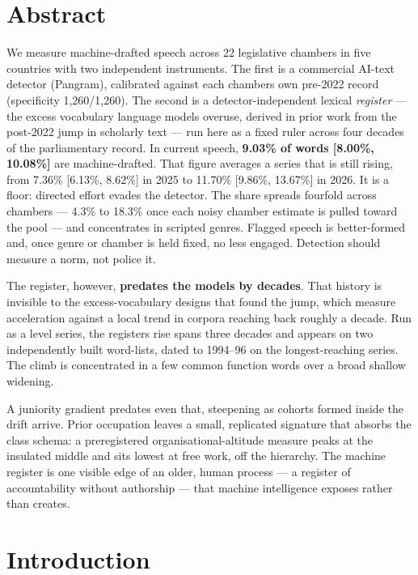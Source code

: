 \section*{Abstract}

We measure machine-drafted speech across 22 legislative chambers in five countries with two independent instruments. The first is a commercial AI-text detector (Pangram), calibrated against each chamber\textquotesingle s own pre-2022 record (specificity 1,260/1,260). The second is a detector-independent lexical \emph{register} --- the excess vocabulary language models overuse, derived in prior work from the post-2022 jump in scholarly text --- run here as a fixed ruler across four decades of the parliamentary record. In current speech, \textbf{9.03\% of words {[}8.00\%, 10.08\%{]}} are machine-drafted. That figure averages a series that is still rising, from 7.36\% {[}6.13\%, 8.62\%{]} in 2025 to 11.70\% {[}9.86\%, 13.67\%{]} in 2026. It is a floor: directed effort evades the detector. The share spreads fourfold across chambers --- 4.3\% to 18.3\% once each noisy chamber estimate is pulled toward the pool --- and concentrates in scripted genres. Flagged speech is better-formed and, once genre or chamber is held fixed, no less engaged. Detection should measure a norm, not police it.

The register, however, \textbf{predates the models by decades}. That history is invisible to the excess-vocabulary designs that found the jump, which measure acceleration against a local trend in corpora reaching back roughly a decade. Run as a level series, the register\textquotesingle s rise spans three decades and appears on two independently built word-lists, dated to 1994--96 on the longest-reaching series. The climb is concentrated in a few common function words over a broad shallow widening.

A juniority gradient predates even that, steepening as cohorts formed inside the drift arrive. Prior occupation leaves a small, replicated signature that absorbs the class schema: a preregistered organisational-altitude measure peaks at the insulated middle and sits lowest at free work, off the hierarchy. The machine register is one visible edge of an older, human process --- a register of accountability without authorship --- that machine intelligence exposes rather than creates.

\section{Introduction}\label{sec:intro}

